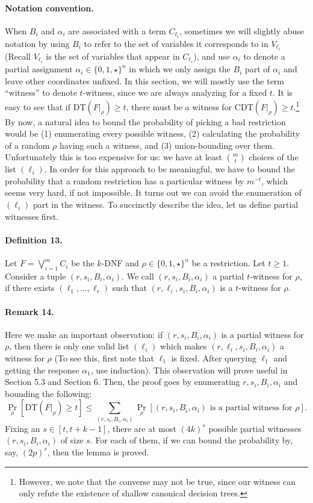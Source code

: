 \paragraph{Notation convention.} When $B_i$ and $\alpha_i$ are associated with a term $C_{\ell_i}$, sometimes we will slightly abuse notation by using $B_i$ to refer to the set of variables it corresponds to in $V_{\ell_i}$ (Recall $V_{\ell_i}$ is the set of variables that appear in $C_{\ell_i}$), and use $\alpha_i$ to denote a partial assignment $\alpha_i\in\{0,1,\star\}^n$ in which we only assign the $B_i$ part of $\alpha_i$ and leave other coordinates unfixed. In this section, we will mostly use the term ``witness'' to denote $t$-witness, since we are always analyzing for a fixed $t$.
It is easy to see that if $\mathrm{DT}(F|_\rho)\ge t$, there must be a witness for $\mathrm{CDT}(F|_\rho)\ge t$.\footnote{However, we note that the converse may not be true, since our witness can only refute the existence of shallow canonical decision trees.} By now, a natural idea to bound the probability of picking a bad restriction would be (1) enumerating every possible witness, (2) calculating the probability of a random $\rho$ having such a witness, and (3) union-bounding over them. Unfortunately this is too expensive for us: we have at least $\binom mt$ choices of the list $(\ell_i)$. In order for this approach to be meaningful, we have to bound the probability that a random restriction has a particular witness by $m^{-t}$, which seems very hard, if not impossible. It turns out we can avoid the enumeration of $(\ell_i)$ part in the witness. To succinctly describe the idea, let us define partial witnesses first.
\paragraph{Definition 13.} Let $F=\bigvee_{i=1}^mC_i$ be the $k$-DNF and $\rho\in\{0,1,\star\}^n$ be a restriction. Let $t\ge1$. Consider a tuple $(r,s_i,B_i,\alpha_i)$. We call $(r,s_i,B_i,\alpha_i)$ a partial $t$-witness for $\rho$, if there exists $(\ell_1,\ldots,\ell_r)$ such that $(r,\ell_i,s_i,B_i,\alpha_i)$ is a $t$-witness for $\rho$.
\paragraph{Remark 14.} Here we make an important observation: if $(r,s_i,B_i,\alpha_i)$ is a partial witness for $\rho$, then there is only one valid list $(\ell_i)$ which makes $(r,\ell_i,s_i,B_i,\alpha_i)$ a witness for $\rho$ (To see this, first note that $\ell_1$ is fixed. After querying $\ell_1$ and getting the response $\alpha_1$, use induction). This observation will prove useful in Section 5.3 and Section 6.
Then, the proof goes by enumerating $r,s_i,B_i,\alpha_i$ and bounding the following:
\[\Pr_\rho[\mathrm{DT}(F|_\rho)\ge t]\le\sum_{(r,s_i,B_i,\alpha_i)}\Pr_\rho[(r,s_i,B_i,\alpha_i)\text{ is a partial witness for }\rho].\tag{5}\]
Fixing an $s\in[t,t+k-1]$, there are at most $(4k)^s$ possible partial witnesses $(r,s_i,B_i,\alpha_i)$ of size $s$. For each of them, if we can bound the probability by, say, $(2p)^s$, then the lemma is proved.
